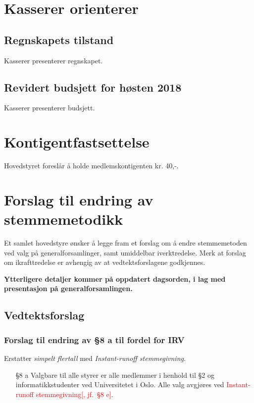\documentclass[10pt,norsk,a4paper]{article}
\begin{document}

\section{Kasserer orienterer}
\subsection{Regnskapets tilstand}
Kasserer presenterer regnskapet.


\subsection{Revidert budsjett for høsten 2018}
Kasserer presenterer budsjett.


\section{Kontigentfastsettelse}
Hovedstyret foreslår å holde medlemskontigenten kr. 40,-.

\section{Forslag til endring av stemmemetodikk}

Et samlet hovedstyre ønsker å legge fram et forslag om å endre stemmemetoden ved valg på generalforsamlinger, samt umiddelbar iverktredelse.
Merk at forslag om ikrafttredelse er avhengig av at vedtektsforslagene godkjennes.

\textbf{Ytterligere detaljer kommer på oppdatert dagsorden, i lag med presentasjon på generalforsamlingen.}

\subsection{Vedtektsforslag}

\subsubsection{Forslag til endring av §8 a til fordel for IRV}

Erstatter \textit{simpelt flertall} med \textit{Instant-runoff stemmegivning}.

\begin{enumerate}
	\item[§8 a] Valgbare til alle styrer er alle medlemmer i henhold til §2 og informatikkstudenter ved Universitetet i Oslo. Alle valg avgjøres ved \textcolor{red}{Instant-runoff stemmegivning[, jf.~§8 e]}.
\end{enumerate}
\end{document}
